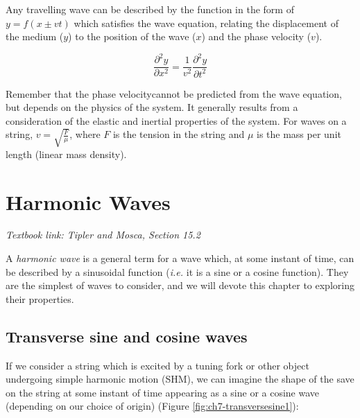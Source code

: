 \documentclass[
]{book}
\begin{document}
Any travelling wave can be described by the function in the form of \(y = f(x \pm vt)\) which satisfies the wave equation, relating the displacement of the medium (\(y\)) to the position of the wave (\(x\)) and the phase velocity (\(v\)).

\begin{equation}
\frac{\partial^2 y}{\partial x^2} = \frac{1}{v^2} \frac{\partial^2 y}{\partial t^2}
\end{equation}

Remember that the phase velocitycannot be predicted from the wave equation, but depends on the physics of the system. It generally results from a consideration of the elastic and inertial properties of the system. For waves on a string, \(v = \sqrt{\frac{F}{\mu}}\), where \(F\) is the tension in the string and \(\mu\) is the mass per unit length (linear mass density).

\hypertarget{sec:ch7-harmonicwaves}{%
\chapter{Harmonic Waves}\label{sec:ch7-harmonicwaves}}

\emph{Textbook link: Tipler and Mosca, Section 15.2}

A \emph{harmonic wave} is a general term for a wave which, at some instant of time, can be described by a sinusoidal function (\emph{i.e.} it is a sine or a cosine function). They are the simplest of waves to consider, and we will devote this chapter to exploring their properties.

\hypertarget{sec:ch7-sinecosine}{%
\section{Transverse sine and cosine waves}\label{sec:ch7-sinecosine}}

If we consider a string which is excited by a tuning fork or other object undergoing simple harmonic motion (SHM), we can imagine the shape of the save on the string at some instant of time appearing as a sine or a cosine wave (depending on our choice of origin) (Figure \ref{fig:ch7-transversesine1}):
\end{document}
